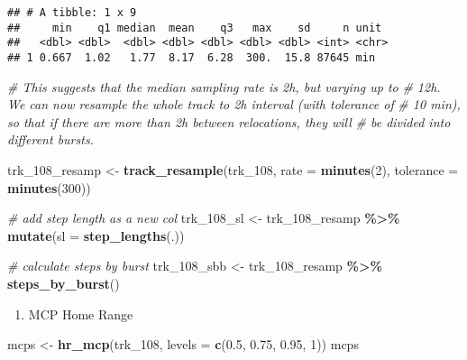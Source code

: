 \documentclass[
]{article}
\newenvironment{Shaded}{\begin{snugshade}}{\end{snugshade}}
\newcommand{\AttributeTok}[1]{\textcolor[rgb]{0.13,0.29,0.53}{#1}}
\newcommand{\CommentTok}[1]{\textcolor[rgb]{0.56,0.35,0.01}{\textit{#1}}}
\newcommand{\DecValTok}[1]{\textcolor[rgb]{0.00,0.00,0.81}{#1}}
\newcommand{\FloatTok}[1]{\textcolor[rgb]{0.00,0.00,0.81}{#1}}
\newcommand{\FunctionTok}[1]{\textcolor[rgb]{0.13,0.29,0.53}{\textbf{#1}}}
\newcommand{\NormalTok}[1]{#1}
\newcommand{\OtherTok}[1]{\textcolor[rgb]{0.56,0.35,0.01}{#1}}
\newcommand{\SpecialCharTok}[1]{\textcolor[rgb]{0.81,0.36,0.00}{\textbf{#1}}}
\providecommand{\tightlist}{%
  \setlength{\itemsep}{0pt}\setlength{\parskip}{0pt}}
\begin{document}
\begin{verbatim}
## # A tibble: 1 x 9
##     min    q1 median  mean    q3   max    sd     n unit 
##   <dbl> <dbl>  <dbl> <dbl> <dbl> <dbl> <dbl> <int> <chr>
## 1 0.667  1.02   1.77  8.17  6.28  300.  15.8 87645 min
\end{verbatim}

\begin{Shaded}
\begin{Highlighting}[]
\CommentTok{\# This suggests that the median sampling rate is 2h, but varying up to}
\CommentTok{\# 12h. We can now resample the whole track to 2h interval (with tolerance of}
\CommentTok{\# 10 min), so that if there are more than 2h between relocations, they will }
\CommentTok{\# be divided into different bursts.}

\NormalTok{trk\_108\_resamp }\OtherTok{\textless{}{-}} \FunctionTok{track\_resample}\NormalTok{(trk\_108, }\AttributeTok{rate =} \FunctionTok{minutes}\NormalTok{(}\DecValTok{2}\NormalTok{), }\AttributeTok{tolerance =} \FunctionTok{minutes}\NormalTok{(}\DecValTok{300}\NormalTok{))}

\CommentTok{\# add step length as a new col}
\NormalTok{trk\_108\_sl }\OtherTok{\textless{}{-}}\NormalTok{ trk\_108\_resamp }\SpecialCharTok{\%\textgreater{}\%} \FunctionTok{mutate}\NormalTok{(}\AttributeTok{sl =} \FunctionTok{step\_lengths}\NormalTok{(.)) }

\CommentTok{\# calculate steps by burst}
\NormalTok{trk\_108\_sbb }\OtherTok{\textless{}{-}}\NormalTok{ trk\_108\_resamp }\SpecialCharTok{\%\textgreater{}\%} \FunctionTok{steps\_by\_burst}\NormalTok{()}
\end{Highlighting}
\end{Shaded}

\begin{enumerate}
\def\labelenumi{\alph{enumi}.}
\tightlist
\item
  MCP Home Range
\end{enumerate}

\begin{Shaded}
\begin{Highlighting}[]
\NormalTok{mcps }\OtherTok{\textless{}{-}} \FunctionTok{hr\_mcp}\NormalTok{(trk\_108, }\AttributeTok{levels =} \FunctionTok{c}\NormalTok{(}\FloatTok{0.5}\NormalTok{, }\FloatTok{0.75}\NormalTok{, }\FloatTok{0.95}\NormalTok{, }\DecValTok{1}\NormalTok{))}
\NormalTok{mcps}
\end{Highlighting}
\end{Shaded}
\end{document}
